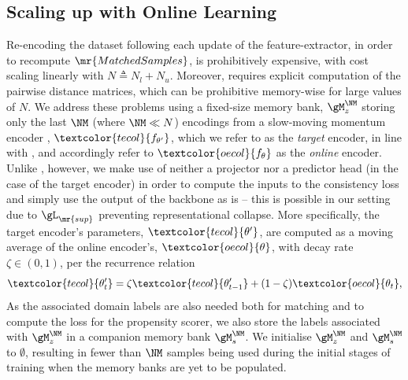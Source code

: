 \subsection{Scaling up with Online Learning}\label{subsec:ol}
%
Re-encoding the dataset following each update of the feature-extractor, in order to recompute
$\mr{MatchedSamples}$, is prohibitively expensive, with cost scaling linearly with $N \triangleq
N_l + N_u$.
%
Moreover, \CNN{} requires explicit computation of the pairwise distance matrices, which can be
prohibitive memory-wise for large values of $N$.
%
We address these problems using a fixed-size memory bank, $\gM^{\NM}_z$ storing only the last $\NM$
(where $\NM \ll N$) encodings from a slow-moving momentum encoder \citep{grill2020bootstrap,
he2020momentum}, $\textcolor{tecol}{f_{\theta^\prime}}$, which we refer to as the
\textcolor{tecol}{\emph{target}} encoder, in line with \cite{grill2020bootstrap}, and accordingly
refer to $\textcolor{oecol}{f_\theta}$ as the \textcolor{oecol}{\emph{online}} encoder.
%
Unlike \cite{grill2020bootstrap}, however, we make use of neither a projector nor a predictor head
(in the case of the target encoder) in order to compute the inputs to the consistency loss and
simply use the output of the backbone as is -- this is possible in our setting due to
$\gL_\mr{sup}$ preventing representational collapse.
%
More specifically, the target encoder's parameters, $\textcolor{tecol}{\theta^\prime}$, are computed as a moving
average of the online encoder's, $\textcolor{oecol}{\theta}$, with decay rate $\zeta \in (0, 1)$, per the recurrence
relation
%
\begin{equation}
  \textcolor{tecol}{\theta^\prime_t} = \zeta \textcolor{tecol}{\theta^\prime_{t - 1}} + (1 - \zeta)
  \textcolor{oecol}{\theta_t},
\end{equation}
%
As the associated domain labels are also needed both for matching and to compute the loss for the
propensity scorer, we also store the labels associated with $\gM^{\NM}_z$ in a companion memory bank
$\gM^{\NM}_s$. 
%
We initialise $\gM^{\NM}_z$ and $\gM^{\NM}_s$ to $\emptyset$, resulting in
fewer than $\NM$ samples being used during the initial stages of training when the memory banks are
yet to be populated.
%

